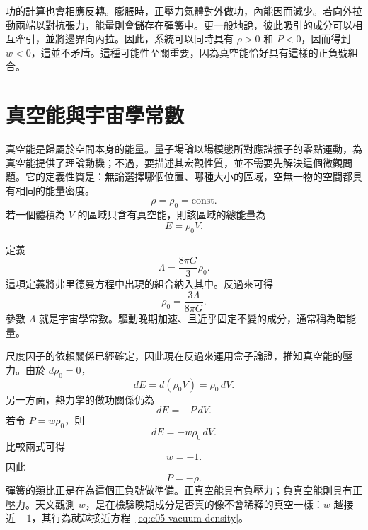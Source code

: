 功的計算也會相應反轉。膨脹時，正壓力氣體對外做功，內能因而減少。若向外拉動兩端以對抗張力，能量則會儲存在彈簧中。更一般地說，彼此吸引的成分可以相互牽引，並將邊界向內拉。因此，系統可以同時具有 \(\rho>0\) 和 \(P<0\)，因而得到 \(w<0\)，這並不矛盾。這種可能性至關重要，因為真空能恰好具有這樣的正負號組合。

\section{真空能與宇宙學常數}

真空能是歸屬於空間本身的能量。量子場論以場模態所對應諧振子的零點運動，為真空能提供了理論動機；不過，要描述其宏觀性質，並不需要先解決這個微觀問題。它的定義性質是：無論選擇哪個位置、哪種大小的區域，空無一物的空間都具有相同的能量密度。
\begin{equation}
\rho=\rho_0=\text{const.}
\label{eq:c05-vacuum-density}
\end{equation}
若一個體積為 \(V\) 的區域只含有真空能，則該區域的總能量為
\begin{equation}
E=\rho_0 V.
\end{equation}
\begin{classroomqa}
\end{classroomqa}

定義
\begin{equation}
\Lambda=\frac{8\pi G}{3}\rho_0.
\label{eq:c05-lambda-definition}
\end{equation}
這項定義將弗里德曼方程中出現的組合納入其中。反過來可得
\begin{equation}
\rho_0=\frac{3\Lambda}{8\pi G}.
\end{equation}
參數 \(\Lambda\) 就是宇宙學常數。驅動晚期加速、且近乎固定不變的成分，通常稱為暗能量。

尺度因子的依賴關係已經確定，因此現在反過來運用盒子論證，推知真空能的壓力。由於 \(d\rho_0=0\)，
\begin{equation}
dE=d(\rho_0V)=\rho_0\,dV.
\end{equation}
另一方面，熱力學的做功關係仍為
\begin{equation}
dE=-P\,dV.
\end{equation}
若令 \(P=w\rho_0\)，則
\begin{equation}
dE=-w\rho_0\,dV.
\end{equation}
比較兩式可得
\begin{equation}
w=-1.
\end{equation}
因此
\begin{equation}
P=-\rho.
\end{equation}
彈簧的類比正是在為這個正負號做準備。正真空能具有負壓力；負真空能則具有正壓力。天文觀測 \(w\)，是在檢驗晚期成分是否真的像不會稀釋的真空一樣：\(w\) 越接近 \(-1\)，其行為就越接近方程~\eqref{eq:c05-vacuum-density}。

